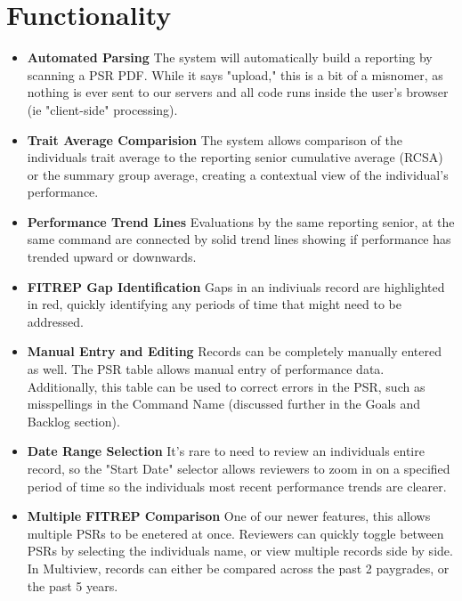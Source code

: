 \documentclass[UTF8]{article}
\begin{document}
\section{Functionality}
\begin{itemize}
  \item \textbf{Automated Parsing} The system will automatically build a reporting by scanning a PSR PDF. While it says "upload," this is a bit of a misnomer, as nothing is ever sent to our servers and all code runs inside the user's browser (ie "client-side" processing).
  \item \textbf{Trait Average Comparision} The system allows comparison of the individuals trait average to the reporting senior cumulative average (RCSA) or the summary group average, creating a contextual view of the individual's performance.
  \item \textbf{Performance Trend Lines} Evaluations by the same reporting senior, at the same command are connected by solid trend lines showing if performance has trended upward or downwards.
  \item \textbf{FITREP Gap Identification} Gaps in an indiviuals record are highlighted in red, quickly identifying any periods of time that might need to be addressed.
  \item \textbf{Manual Entry and Editing} Records can be completely manually entered as well. The PSR table allows manual entry of performance data. Additionally, this table can be used to correct errors in the PSR, such as misspellings in the Command Name (discussed further in the Goals and Backlog section).
  \item \textbf{Date Range Selection} It's rare to need to review an individuals entire record, so the "Start Date" selector allows reviewers to zoom in on a specified period of time so the individuals most recent performance trends are clearer.
  \item \textbf{Multiple FITREP Comparison} One of our newer features, this allows multiple PSRs to be enetered at once. Reviewers can quickly toggle between PSRs by selecting the individuals name, or view multiple records side by side. In Multiview, records can either be compared across the past 2 paygrades, or the past 5 years.
\end{itemize}
\end{document}
